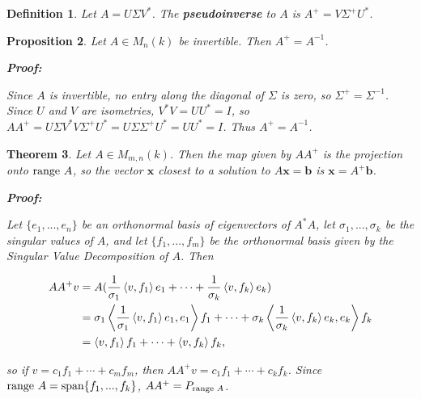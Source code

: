 \documentclass{article}
\theoremstyle{colontheorem}
\newtheorem{theorem}{Theorem}[section]
\newtheorem{proposition}[theorem]{Proposition}
\newtheorem{definition}[theorem]{Definition}
\newcommand{\Span}{\textnormal{span}}
\newcommand{\Range}{\textnormal{range }}
\newenvironment{Theorem}
{
	\begin{mdframed}[backgroundcolor=TheoremOrange!10]
	\begin{theorem}
}
{
	\end{theorem}
	\end{mdframed}
	
	\vspace{.15in}
}
\newenvironment{Proposition}
{
	\begin{mdframed}[backgroundcolor=TheoremOrange!10]
	\begin{proposition}
}
{
	\end{proposition}
	\end{mdframed}
	
	\vspace{.15in}
}
\newenvironment{Def}
{
	\begin{mdframed}[backgroundcolor=DefGreen!10]
	\begin{definition}
}
{
	\end{definition}
	\end{mdframed}
	
	\vspace{.15in}
}
\newenvironment{Proof}
{
	\begin{mdframed}[backgroundcolor=ProofPurple!10]
	\textbf{Proof:}%
}
{
	\end{mdframed}
	
	\vspace{.085in}
}
\begin{document}
\begin{Def}
	
	Let $A = U \Sigma V^*$. The \textbf{pseudoinverse} to $A$ is $A^+ = V \Sigma^+ U^*$.
	
\end{Def}



\begin{Proposition}
	
	Let $A \in M_n(k)$ be invertible. Then $A^+ = A^{-1}$.
	
	\begin{Proof}
		Since $A$ is invertible, no entry along the diagonal of $\Sigma$ is zero, so $\Sigma^+ = \Sigma^{-1}$. Since $U$ and $V$ are isometries, $V^* V = U U^* = I$, so $AA^+ = U \Sigma V^* V \Sigma^+ U^* = U \Sigma \Sigma^+ U^* = U U^* = I$. Thus $A^+ = A^{-1}$.
		
	\end{Proof}
	
\end{Proposition}



\begin{Theorem}
	
	Let $A \in M_{m, n}(k)$. Then the map given by $AA^+$ is the projection onto $\Range A$, so the vector $\mathbf{x}$ closest to a solution to $A\mathbf{x} = \mathbf{b}$ is $\mathbf{x} = A^+ \mathbf{b}$.
	
	\begin{Proof}
		Let $\{e_1, ..., e_n\}$ be an orthonormal basis of eigenvectors of $A^* A$, let $\sigma_1, ..., \sigma_k$ be the singular values of $A$, and let $\{f_1, ..., f_m\}$ be the orthonormal basis given by the Singular Value Decomposition of $A$. Then
		
		\begin{align*}
			AA^+ v &= A(\frac{1}{\sigma_1} \left< v, f_1 \right> e_1 + \cdots + \frac{1}{\sigma_k} \left< v, f_k \right> e_k)\\
			&= \sigma_1 \left< \frac{1}{\sigma_1} \left< v, f_1 \right> e_1, e_1 \right> f_1 + \cdots + \sigma_k \left< \frac{1}{\sigma_k} \left< v, f_k \right> e_k, e_k \right> f_k\\
			&= \left< v, f_1 \right> f_1 + \cdots + \left< v, f_k \right> f_k \textnormal{,}
		\end{align*}
		
		so if $v = c_1 f_1 + \cdots + c_m f_m$, then $AA^+ v = c_1 f_1 + \cdots + c_k f_k$. Since $\Range A = \Span \{f_1, ..., f_k\}$, $AA^+ = P_{\Range A}$.
		
	\end{Proof}
	
\end{Theorem}
\end{document}
